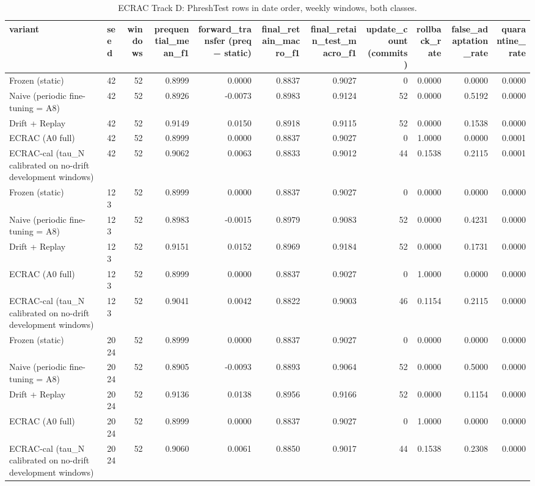 \begin{table}[t]
\centering
\scriptsize
\caption{ECRAC Track D: PhreshTest rows in date order, weekly windows, both classes.}
\label{tab:rev_R18_trackD_ecrac_forward_in_time}
\begin{tabular}{llrrrrrrrrr}
\toprule
variant & seed & windows & prequential\_mean\_f1 & forward\_transfer (preq − static) & final\_retain\_macro\_f1 & final\_retain\_test\_macro\_f1 & update\_count (commits) & rollback\_rate & false\_adaptation\_rate & quarantine\_rate \\
\midrule
Frozen (static) & 42 & 52 & 0.8999 & 0.0000 & 0.8837 & 0.9027 & 0 & 0.0000 & 0.0000 & 0.0000 \\
Naive (periodic fine-tuning = A8) & 42 & 52 & 0.8926 & -0.0073 & 0.8983 & 0.9124 & 52 & 0.0000 & 0.5192 & 0.0000 \\
Drift + Replay & 42 & 52 & 0.9149 & 0.0150 & 0.8918 & 0.9115 & 52 & 0.0000 & 0.1538 & 0.0000 \\
ECRAC (A0 full) & 42 & 52 & 0.8999 & 0.0000 & 0.8837 & 0.9027 & 0 & 1.0000 & 0.0000 & 0.0001 \\
ECRAC-cal (tau\_N calibrated on no-drift development windows) & 42 & 52 & 0.9062 & 0.0063 & 0.8833 & 0.9012 & 44 & 0.1538 & 0.2115 & 0.0001 \\
Frozen (static) & 123 & 52 & 0.8999 & 0.0000 & 0.8837 & 0.9027 & 0 & 0.0000 & 0.0000 & 0.0000 \\
Naive (periodic fine-tuning = A8) & 123 & 52 & 0.8983 & -0.0015 & 0.8979 & 0.9083 & 52 & 0.0000 & 0.4231 & 0.0000 \\
Drift + Replay & 123 & 52 & 0.9151 & 0.0152 & 0.8969 & 0.9184 & 52 & 0.0000 & 0.1731 & 0.0000 \\
ECRAC (A0 full) & 123 & 52 & 0.8999 & 0.0000 & 0.8837 & 0.9027 & 0 & 1.0000 & 0.0000 & 0.0000 \\
ECRAC-cal (tau\_N calibrated on no-drift development windows) & 123 & 52 & 0.9041 & 0.0042 & 0.8822 & 0.9003 & 46 & 0.1154 & 0.2115 & 0.0000 \\
Frozen (static) & 2024 & 52 & 0.8999 & 0.0000 & 0.8837 & 0.9027 & 0 & 0.0000 & 0.0000 & 0.0000 \\
Naive (periodic fine-tuning = A8) & 2024 & 52 & 0.8905 & -0.0093 & 0.8893 & 0.9064 & 52 & 0.0000 & 0.5000 & 0.0000 \\
Drift + Replay & 2024 & 52 & 0.9136 & 0.0138 & 0.8956 & 0.9166 & 52 & 0.0000 & 0.1154 & 0.0000 \\
ECRAC (A0 full) & 2024 & 52 & 0.8999 & 0.0000 & 0.8837 & 0.9027 & 0 & 1.0000 & 0.0000 & 0.0000 \\
ECRAC-cal (tau\_N calibrated on no-drift development windows) & 2024 & 52 & 0.9060 & 0.0061 & 0.8850 & 0.9017 & 44 & 0.1538 & 0.2308 & 0.0000 \\
\bottomrule
\end{tabular}
\end{table}